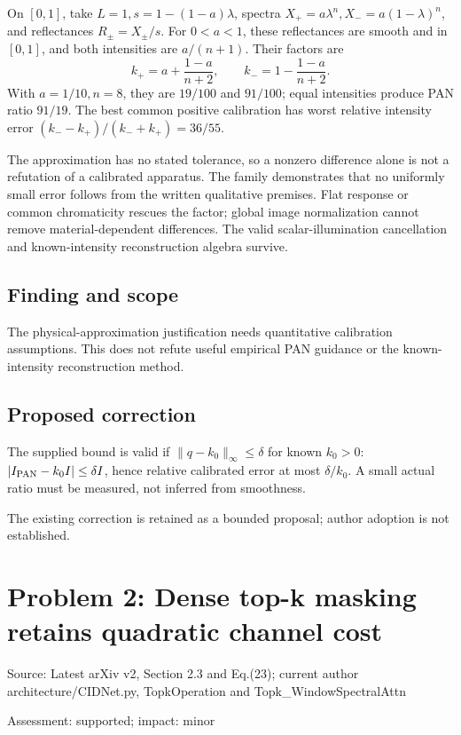 \documentclass[11pt]{article}
\begin{document}
On \([0,1]\), take \(L=1,s=1-(1-a)\lambda\), spectra \(X_+=a\lambda^n,X_-=a(1-\lambda)^n\), and reflectances \(R_\pm=X_\pm/s\). For \(0<a<1\), these reflectances are smooth and in \([0,1]\), and both intensities are \(a/(n+1)\). Their factors are \[k_+=a+\frac{1-a}{n+2},\qquad k_-=1-\frac{1-a}{n+2}.\] With \(a=1/10,n=8\), they are \(19/100\) and \(91/100\); equal intensities produce PAN ratio \(91/19\). The best common positive calibration has worst relative intensity error \((k_--k_+)/(k_-+k_+)=36/55\).

The approximation has no stated tolerance, so a nonzero difference alone is not a refutation of a calibrated apparatus. The family demonstrates that no uniformly small error follows from the written qualitative premises. Flat response or common chromaticity rescues the factor; global image normalization cannot remove material-dependent differences. The valid scalar-illumination cancellation and known-intensity reconstruction algebra survive.

\subsection*{Finding and scope}

The physical-approximation justification needs quantitative calibration assumptions. This does not refute useful empirical PAN guidance or the known-intensity reconstruction method.

\subsection*{Proposed correction}

The supplied bound is valid if \(\|q-k_0\|_\infty\leq\delta\) for known \(k_0>0\): \(|I_{\rm PAN}-k_0I|\leq\delta I\), hence relative calibrated error at most \(\delta/k_0\). A small actual ratio must be measured, not inferred from smoothness.

The existing correction is retained as a bounded proposal; author adoption is not established.

\section*{Problem 2: Dense top-k masking retains quadratic channel cost}

Source: Latest arXiv v2, Section 2.3 and Eq.(23); current author architecture/CIDNet.py, TopkOperation and Topk\_WindowSpectralAttn

Assessment: supported; impact: minor
\end{document}
